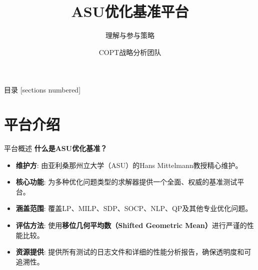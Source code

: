 \documentclass[10pt]{beamer}
\title{ASU优化基准平台}
\subtitle{理解与参与策略}
\date{} %
\author{COPT战略分析团队}
\institute{内部战略研讨}
\begin{document}
\maketitle

\begin{frame}{目录}
  [sections numbered]
  \tableofcontents
\end{frame}

\section{平台介绍}

\begin{frame}{平台概述}
  \textbf{什么是ASU优化基准？}
  \begin{itemize}
    \item \textbf{维护方}: 由亚利桑那州立大学（ASU）的Hans Mittelmann教授精心维护。
    \item \textbf{核心功能}: 为多种优化问题类型的求解器提供一个全面、权威的基准测试平台。
    \item \textbf{涵盖范围}: 覆盖LP、MILP、SDP、SOCP、NLP、QP及其他专业优化问题。
    \item \textbf{评估方法}: 使用\textbf{移位几何平均数（Shifted Geometric Mean）}进行严谨的性能比较。
    \item \textbf{资源提供}: 提供所有测试的日志文件和详细的性能分析报告，确保透明度和可追溯性。
  \end{itemize}
\end{frame}
\end{document}
